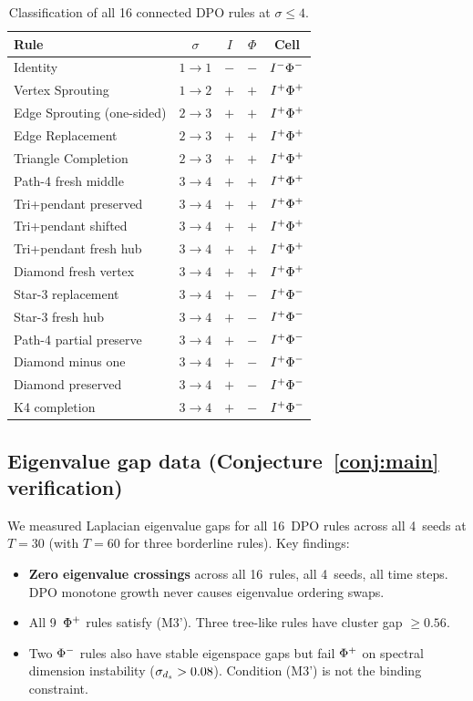 \documentclass{../shared/primo}
\begin{document}
\begin{table}[ht]
\centering
\small
\begin{tabular}{lcccc}
\toprule
Rule & $\sigma$ & $I$ & $\Phi$ & Cell \\
\midrule
Identity & $1 \to 1$ & $-$ & $-$ & $I\textsuperscript{$-$}\Phi\textsuperscript{$-$}$ \\
Vertex Sprouting & $1 \to 2$ & $+$ & $+$ & $I\textsuperscript{+}\Phi\textsuperscript{+}$ \\
Edge Sprouting (one-sided) & $2 \to 3$ & $+$ & $+$ & $I\textsuperscript{+}\Phi\textsuperscript{+}$ \\
Edge Replacement & $2 \to 3$ & $+$ & $+$ & $I\textsuperscript{+}\Phi\textsuperscript{+}$ \\
Triangle Completion & $2 \to 3$ & $+$ & $+$ & $I\textsuperscript{+}\Phi\textsuperscript{+}$ \\
Path-4 fresh middle & $3 \to 4$ & $+$ & $+$ & $I\textsuperscript{+}\Phi\textsuperscript{+}$ \\
Tri+pendant preserved & $3 \to 4$ & $+$ & $+$ & $I\textsuperscript{+}\Phi\textsuperscript{+}$ \\
Tri+pendant shifted & $3 \to 4$ & $+$ & $+$ & $I\textsuperscript{+}\Phi\textsuperscript{+}$ \\
Tri+pendant fresh hub & $3 \to 4$ & $+$ & $+$ & $I\textsuperscript{+}\Phi\textsuperscript{+}$ \\
Diamond fresh vertex & $3 \to 4$ & $+$ & $+$ & $I\textsuperscript{+}\Phi\textsuperscript{+}$ \\
Star-3 replacement & $3 \to 4$ & $+$ & $-$ & $I\textsuperscript{+}\Phi\textsuperscript{$-$}$ \\
Star-3 fresh hub & $3 \to 4$ & $+$ & $-$ & $I\textsuperscript{+}\Phi\textsuperscript{$-$}$ \\
Path-4 partial preserve & $3 \to 4$ & $+$ & $-$ & $I\textsuperscript{+}\Phi\textsuperscript{$-$}$ \\
Diamond minus one & $3 \to 4$ & $+$ & $-$ & $I\textsuperscript{+}\Phi\textsuperscript{$-$}$ \\
Diamond preserved & $3 \to 4$ & $+$ & $-$ & $I\textsuperscript{+}\Phi\textsuperscript{$-$}$ \\
K4 completion & $3 \to 4$ & $+$ & $-$ & $I\textsuperscript{+}\Phi\textsuperscript{$-$}$ \\
\bottomrule
\end{tabular}
\caption{Classification of all 16 connected DPO rules at $\sigma \leq 4$.}
\label{tab:enumeration}
\end{table}

\subsection{Eigenvalue gap data (Conjecture~\ref{conj:main} verification)}

We measured Laplacian eigenvalue gaps for all 16~DPO rules across all 4~seeds at $T = 30$ (with $T = 60$ for three borderline rules). Key findings:
\begin{itemize}
\item \textbf{Zero eigenvalue crossings} across all 16~rules, all 4~seeds, all time steps. DPO monotone growth never causes eigenvalue ordering swaps.
\item All 9~$\Phi\textsuperscript{+}$ rules satisfy (M3'). Three tree-like rules have cluster gap $\geq 0.56$.
\item Two $\Phi\textsuperscript{$-$}$ rules also have stable eigenspace gaps but fail $\Phi\textsuperscript{+}$ on spectral dimension instability ($\sigma_{d_s} > 0.08$). Condition (M3') is not the binding constraint.
\end{itemize}
\end{document}
